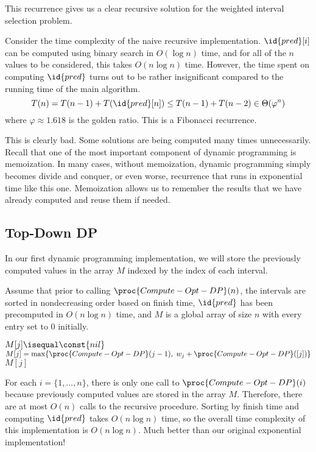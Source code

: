 This recurrence gives us a clear recursive solution for the weighted interval selection problem.

Consider the time complexity of the naive recursive implementation. $\id{pred}[i]$ can be computed using binary search in $O(\log n)$ time, and for all of the $n$ values to be considered, this takes $O(n \log n)$ time. However, the time spent on computing $\id{pred}$ turns out to be rather insignificant compared to the running time of the main algorithm.
$$
T(n) = T(n-1) + T(\id{pred}[n]) \leq T(n-1) + T(n-2) \in \Theta(\varphi^n)
$$
where $\varphi \approx 1.618$ is the golden ratio. This is a Fibonacci recurrence.

This is clearly bad. Some solutions are being computed many times unnecessarily. Recall that one of the most important component of dynamic programming is memoization. In many cases, without memoization, dynamic programming simply becomes divide and conquer, or even worse, recurrence that runs in exponential time like this one. Memoization allows us to remember the results that we have already computed and reuse them if needed.

\subsection{Top-Down DP}
In our first dynamic programming implementation, we will store the previously computed values in the array $M$ indexed by the index of each interval.

Assume that prior to calling $\proc{Compute-Opt-DP}(n)$, the intervals are sorted in nondecreasing order based on finish time, $\id{pred}$ has been precomputed in $O(n\log n)$ time, and $M$ is a global array of size $n$ with every entry set to 0 initially.

\begin{codebox}
    \li \If $M[j] \isequal \const{nil}$ \Then 
        \li $M[j] = \max\{\proc{Compute-Opt-DP}(j-1),\; w_j + \proc{Compute-Opt-DP}(\index{pred}[j]) \}$
    \End
    \li \Return $M[j]$
\end{codebox}

For each $i = \{1,\ldots,n\}$, there is only one call to $\proc{Compute-Opt-DP}(i)$ because previously computed values are stored in the array $M$. Therefore, there are at most $O(n)$ calls to the recursive procedure. Sorting by finish time and computing $\id{pred}$ takes $O(n \log n)$ time, so the overall time complexity of this implementation is $O(n \log n)$. Much better than our original exponential implementation!

